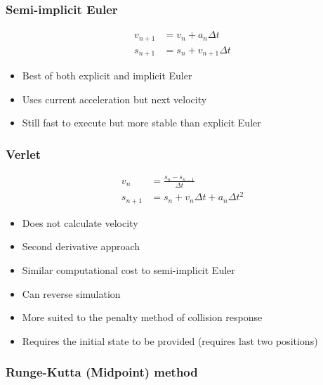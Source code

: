 \documentclass[a4paper]{article}
\begin{document}
\subsubsection{Semi-implicit Euler}

\begin{align*}
  v_{n + 1} &= v_{n} + a_{n} \Delta t \\
  s_{n + 1} &= s_{n} + v_{n + 1} \Delta t
\end{align*}

\begin{itemize}
  \item
    Best of both explicit and implicit Euler

  \item
    Uses current acceleration but next velocity

  \item
    Still fast to execute but more stable than explicit Euler

\end{itemize}

\subsubsection{Verlet}

\begin{align*}
  v_{n} &= \frac{s_{n} - s_{n - 1}}{\Delta t} \\
  s_{n + 1} &= s_{n} + v_{n} \Delta t + a_{n} \Delta t^{2}
\end{align*}

\begin{itemize}
  \item
    Does not calculate velocity

  \item
    Second derivative approach

  \item
    Similar computational cost to semi-implicit Euler

  \item
    Can reverse simulation

  \item
    More suited to the penalty method of collision response

  \item
    Requires the initial state to be provided (requires last two positions)

\end{itemize}

\subsubsection{Runge-Kutta (Midpoint) method}
\end{document}
